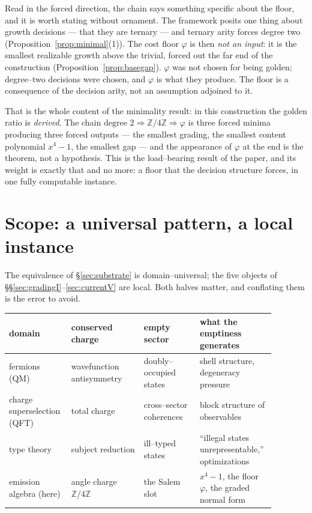 \documentclass[11pt]{article}
\theoremstyle{plain}
\theoremstyle{definition}
\theoremstyle{remark}
\newcommand{\Z}{\mathbb{Z}}
\begin{document}
Read in the forced direction, the chain says something specific about the floor, and it is worth stating without ornament. The framework posits one thing about growth decisions --- that they are ternary --- and ternary arity forces degree two (Proposition~\ref{prop:minimal}(1)). The cost floor $\varphi$ is then \emph{not an input}: it is the smallest realizable growth above the trivial, forced out the far end of the construction (Proposition~\ref{prop:basegap}). $\varphi$ was not chosen for being golden; degree--two decisions were chosen, and $\varphi$ is what they produce. The floor is a consequence of the decision arity, not an assumption adjoined to it.

That is the whole content of the minimality result: in this construction the golden ratio is \emph{derived}. The chain $\text{degree }2\Rightarrow\Z/4\Z\Rightarrow\varphi$ is three forced minima producing three forced outputs --- the smallest grading, the smallest content polynomial $x^4-1$, the smallest gap --- and the appearance of $\varphi$ at the end is the theorem, not a hypothesis. This is the load--bearing result of the paper, and its weight is exactly that and no more: a floor that the decision structure forces, in one fully computable instance.

\section{Scope: a universal pattern, a local instance}\label{sec:scope}

The equivalence of \S\ref{sec:substrate} is domain--universal; the five objects of \S\S\ref{sec:gradingI}--\ref{sec:currentV} are local. Both halves matter, and conflating them is the error to avoid.

\begin{center}
\renewcommand{\arraystretch}{1.25}
\begin{tabular}{@{}p{0.20\linewidth} p{0.26\linewidth} p{0.20\linewidth} p{0.22\linewidth}@{}}
\toprule
domain & conserved charge & empty sector & what the emptiness generates \\
\midrule
fermions (QM) & wavefunction antisymmetry & doubly--occupied states & shell structure, degeneracy pressure \\
charge superselection (QFT) & total charge & cross--sector coherences & block structure of observables \\
type theory & subject reduction & ill--typed states & ``illegal states unrepresentable,'' optimizations \\
emission algebra (here) & angle charge $\Z/4\Z$ & the Salem slot & $x^4-1$, the floor $\varphi$, the graded normal form \\
\bottomrule
\end{tabular}
\end{center}
\end{document}
